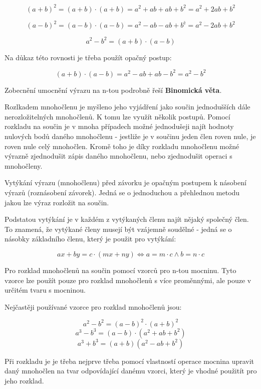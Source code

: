 $$ (a + b)^2 = (a + b) \cdot (a + b) = a^2 + ab + ab + b^2 = a^2 +2ab +b^2 $$

$$ (a-b)^2 = (a-b) \cdot (a-b) = a^2 -ab -ab +b^ě = a^2 -2ab + b^2 $$

$$ a^2-b^2 = (a + b) \cdot (a-b) $$

Na důkaz této rovnosti je třeba použít opačný postup:

$$ (a + b) \cdot (a-b) = a^2 -ab +ab -b^2 = a^2-b^2 $$

Zobecnění umocnění výrazu na n-tou podrobně řeší {\bf Binomická věta}.


Rozlkadem mnohočlenu je myšleno jeho vyjádření jako součin jednodušších dále nerozložitelných mnohočlenů. K tomu lze využít několik postupů. Pomocí rozkladu na součin je v mnoha případech možné jednodušeji najít hodnoty nulových bodů daného mnohočlenu - jestliže je v součinu jeden člen roven nule, je roven nule celý mnohočlen. Kromě toho je díky rozkladu mnohočlenu možné výrazně zjednodušit zápis daného mnohočlenu, nebo zjednodušit operaci s mnohočleny.


Vytýkání výrazu (mnohočlenu) před závorku je opačným postupem k násobení výrazů (roznásobení závorek). Jedná se o jednoduchou a přehlednou metodu jakou lze výraz rozložit na součin. 

Podstatou vytýkání je v každém z vytýkaných členu najít nějaký společný člen. To znamená, že vytýkané členy musejí být vzájemně soudělné - jedná se o násobky základního členu, který je použit pro vytýkání:

$$ ax + by = c\cdot (mx + ny) \Leftrightarrow a = m\cdot c \wedge b = n\cdot c $$


Pro rozklad mnohočlenů na součin pomocí vzorců pro n-tou mocninu. Tyto vzorce lze použít pouze pro rozklad mnohočlenů s více proměnnými, ale pouze v určitém tvaru s mocninou.

Nejčastěji používané vzorce pro rozklad mnohočlenů jsou:

$$ a^2 -b^2 = (a-b)^2 \cdot (a+b)^2 $$
$$ a^3 - b^3 = (a-b) \cdot (a^2 + ab +b^2) $$
$$ a^3 + b^3 =(a+b)(a^2-ab+b^2) $$


Při rozkladu je je třeba nejprve třeba pomocí vlastností operace mocnina upravit daný mnohočlen na tvar odpovídající danému vzorci, který je vhodné použitít pro jeho rozklad.


